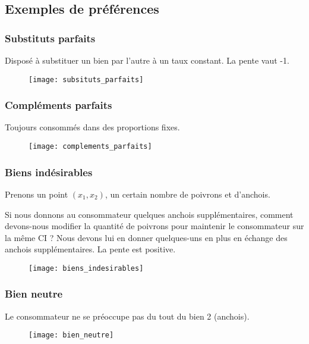 \subsection{Exemples de préférences}

\subsubsection{Substituts parfaits}

Disposé à substituer un bien par l’autre à un taux constant. La pente vaut -1.
\begin{figure}[H]
	\centering
	\texttt{[image: subsituts\_parfaits]}
\end{figure}

\subsubsection{Compléments parfaits}

Toujours consommés dans des proportions fixes.
\begin{figure}[H]
	\centering
	\texttt{[image: complements\_parfaits]}
\end{figure}


\subsubsection{Biens indésirables}

Prenons un point $(x_1, x_2)$, un certain nombre de poivrons et d’anchois.

Si nous donnons au consommateur quelques anchois supplémentaires, comment devons-nous modifier la quantité de poivrons pour maintenir le consommateur sur la même CI ? Nous devons lui en donner quelques-uns en plus en échange des anchois supplémentaires. La pente est positive.

\begin{figure}[H]
	\centering
	\texttt{[image: biens\_indesirables]}
\end{figure}

\subsubsection{Bien neutre}

Le consommateur ne se préoccupe pas du tout du bien 2 (anchois).
\begin{figure}[H]
	\centering
	\texttt{[image: bien\_neutre]}
\end{figure}

